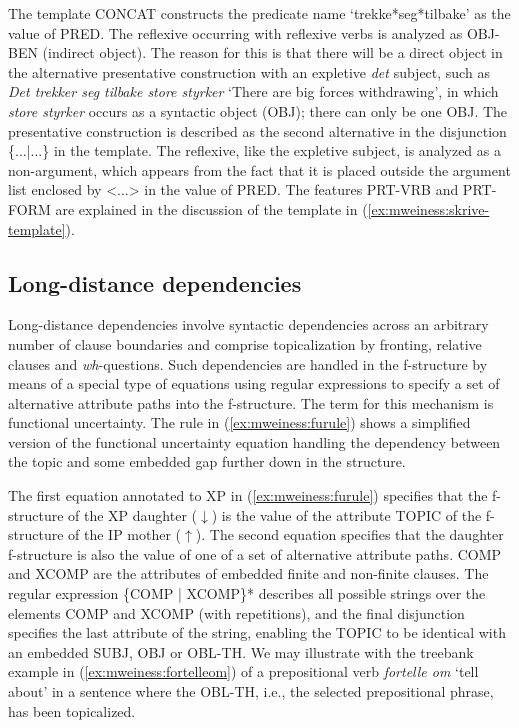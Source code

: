 \documentclass[output=paper]{langsci/langscibook}
\begin{document}
The template CONCAT constructs the predicate name `trekke*seg*tilbake' as the value of PRED.
The reflexive occurring with reflexive verbs is analyzed as OBJ-BEN (indirect object).
The reason for this is that there will be a direct object in the alternative presentative construction with an expletive \textit{det} subject, such as \textit{Det trekker seg tilbake store styrker} `There are big forces withdrawing', in which \textit{store styrker} occurs as a syntactic object (OBJ); there can only be one OBJ.
The presentative construction is described as the second alternative in the disjunction \{...|...\} in the template.
The reflexive, like the expletive subject, is analyzed as a non-argument, which appears from the fact that it is placed outside the argument list enclosed by <...> in the value of PRED.
The features PRT-VRB and PRT-FORM are explained in the discussion of the template in (\ref{ex:mweiness:skrive-template}).

\subsection{Long-distance dependencies}\label{sec:mweiness:longdist}

Long-distance dependencies involve syntactic dependencies across an arbitrary number of clause boundaries and comprise topicalization by fronting, relative clauses and \textit{wh}-questions.
Such dependencies are handled in the f-structure by means of a special type of equations using regular expressions to specify a set of alternative attribute paths into the f-structure.
The term for this mechanism is functional uncertainty.
The rule in (\ref{ex:mweiness:furule}) shows a simplified version of the functional uncertainty equation handling the dependency between the topic and some embedded gap further down in the structure.


The first equation annotated to XP in (\ref{ex:mweiness:furule}) specifies that the f-structure of the XP daughter ($\downarrow$) is the value of the attribute TOPIC of the f-structure of the IP mother ($\uparrow$).
The second equation specifies that the daughter f-structure is also the value of one of a set of alternative attribute paths.
COMP and XCOMP are the attributes of embedded finite and non-finite clauses.
The regular expression \{COMP | XCOMP\}* describes all possible strings over the elements COMP and XCOMP (with repetitions), and the final disjunction specifies the last attribute of the string, enabling the TOPIC to be identical with an embedded SUBJ, OBJ or OBL-TH.
We may illustrate with the treebank example in (\ref{ex:mweiness:fortelleom}) of a prepositional verb \textit{fortelle om} `tell about' in a sentence where the OBL-TH, i.e., the selected prepositional phrase, has been topicalized.
\end{document}
